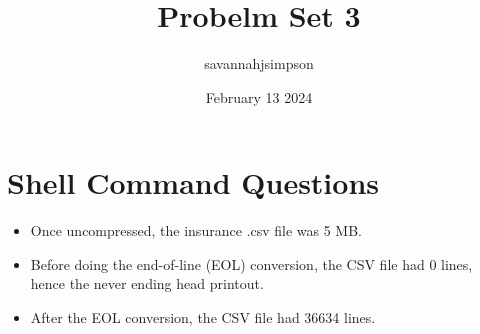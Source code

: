 \documentclass{article}
\title{Probelm Set 3}
\author{savannahjsimpson }
\date{February 13 2024}
\begin{document}
\maketitle

\section{Shell Command Questions}
\begin{itemize}
\item Once uncompressed, the insurance .csv file was 5 MB. 
\item Before doing the end-of-line (EOL) conversion, the CSV file had 0 lines, hence the never ending head printout. 
\item After the EOL conversion, the CSV file had 36634 lines.
\end{itemize}
\end{document}
